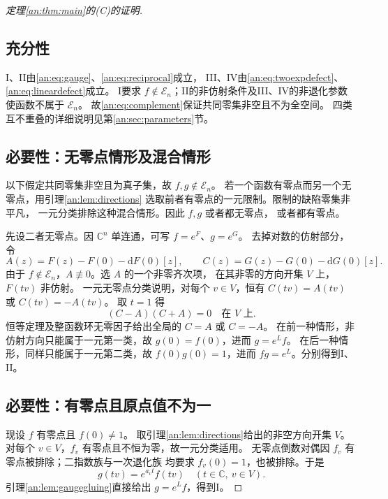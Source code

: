 \documentclass[11pt,a4paper,oneside,openany]{book}
\theoremstyle{lecture}
\newcommand{\C}{\mathbb C}
\newcommand{\En}{\mathcal E_n}
\newcommand{\dd}{\mathrm d}
\newcommand{\e}{e}
\numberwithin{equation}{section}
\begin{document}
\begin{proof}[定理\ref{an:thm:main}的(C)的证明]
\subsection{充分性}
I、II由\eqref{an:eq:gauge}、\eqref{an:eq:reciprocal}成立，
III、IV由\eqref{an:eq:twoexpdefect}、\eqref{an:eq:lineardefect}成立。
I要求 $f\notin\En$；II的非仿射条件及III、IV的非退化参数使函数不属于 $\En$。
故\eqref{an:eq:complement}保证共同零集非空且不为全空间。
四类互不重叠的详细说明见第\ref{an:sec:parameters}节。

\subsection{必要性：无零点情形及混合情形}
以下假定共同零集非空且为真子集，故 $f,g\notin\En$。
若一个函数有零点而另一个无零点，用引理\ref{an:lem:directions}
选取前者有零点的一元限制。限制的缺陷零集非平凡，
一元分类排除这种混合情形。因此 $f,g$ 或者都无零点，
或者都有零点。

先设二者无零点。因 $\C^n$ 单连通，可写 $f=\e^F$、$g=\e^G$。
去掉对数的仿射部分，令
\[
 A(z)=F(z)-F(0)-\dd F(0)[z],\qquad
 C(z)=G(z)-G(0)-\dd G(0)[z].
\]
由于 $f\notin\En$，$A\not\equiv0$。选 $A$ 的一个非零齐次项，
在其非零的方向开集 $V$ 上，$F(tv)$ 非仿射。
一元无零点分类说明，对每个 $v\in V$，恒有
$C(tv)=A(tv)$ 或 $C(tv)=-A(tv)$。
取 $t=1$ 得
\[
 (C-A)(C+A)=0\quad\text{在 }V\text{ 上}.
\]
恒等定理及整函数环无零因子给出全局的 $C=A$ 或 $C=-A$。
在前一种情形，非仿射方向只能属于一元第一类，故
$g(0)=f(0)$，进而 $g=\e^L f$。
在后一种情形，同样只能属于一元第二类，故
$f(0)g(0)=1$，进而 $fg=\e^L$。分别得到I、II。

\subsection{必要性：有零点且原点值不为一}
现设 $f$ 有零点且 $f(0)\ne1$。
取引理\ref{an:lem:directions}给出的非空方向开集 $V$。
对每个 $v\in V$，$f_v$ 有零点且不恒为零，故一元分类适用。
无零点倒数对偶因 $f_v$ 有零点被排除；二指数族与一次退化族
均要求 $f_v(0)=1$，也被排除。于是
\[
 g(tv)=\e^{a_vt}f(tv)\quad(t\in\C,\ v\in V).
\]
引理\ref{an:lem:gaugegluing}直接给出 $g=\e^L f$，得到I。


\end{proof}
\end{document}

